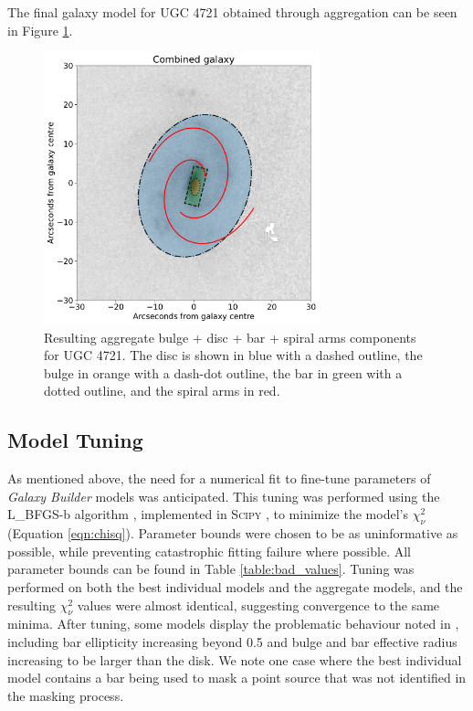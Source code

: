 \documentclass[../main.tex]{subfiles}
\begin{document}
The final galaxy model for UGC 4721 obtained through aggregation can be seen in Figure \ref{fig:aggregate_model}.

\begin{figure}
  \includegraphics[width=8cm]{images__method/aggregate_model.pdf}
  \caption{Resulting aggregate bulge + disc + bar + spiral arms components for UGC 4721. The disc is shown in blue with a dashed outline, the bulge in orange with a dash-dot outline, the bar in green with a dotted outline, and the spiral arms in red.}
  \label{fig:aggregate_model}
\end{figure}

\subsection{Model Tuning}

As mentioned above, the need for a numerical fit to fine-tune parameters of \textit{Galaxy Builder} models was anticipated. This tuning was performed using the L\_BFGS-b algorithm \citep{doi:10.1137/0916069}, implemented in \textsc{Scipy} \citep{scipy-paper}, to minimize the model's $\chi_\nu^2$ (Equation \ref{eqn:chisq}). Parameter bounds were chosen to be as uninformative as possible, while preventing catastrophic fitting failure where possible. All parameter bounds can be found in Table \ref{table:bad_values}. Tuning was performed on both the best individual models and the aggregate models, and the resulting $\chi_\nu^2$ values were almost identical, suggesting convergence to the same minima. After tuning, some models display the problematic behaviour noted in \citet{2018MNRAS.473.4731K}, including bar ellipticity increasing beyond 0.5 and bulge and bar effective radius increasing to be larger than the disk. We note one case where the best individual model contains a bar being used to mask a point source that was not identified in the masking process.
\end{document}
